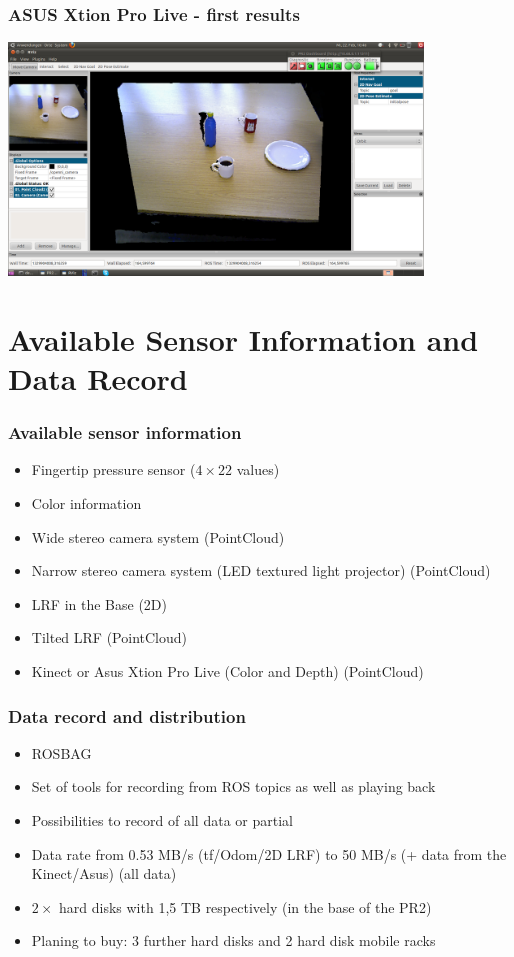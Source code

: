 \begin{frame}
 \frametitle{ASUS Xtion Pro Live - first results}
\includegraphics[width=11cm]{../images/asus1.png}
\end{frame}


\section{Available Sensor Information and Data Record}
\begin{frame}
 \frametitle{Available sensor information}
\begin{itemize}
 \item Fingertip pressure sensor ($4 \times 22$ values)
 \item Color information
 \item Wide stereo camera system (PointCloud)
 \item Narrow stereo camera system (LED textured light projector) (PointCloud)
 \item LRF in the Base (2D)
 \item Tilted LRF (PointCloud)
 \item Kinect or Asus Xtion Pro Live (Color and Depth) (PointCloud)
\end{itemize}

\end{frame}

\begin{frame}
 \frametitle{Data record and distribution}
 \begin{itemize}
  \item ROSBAG
  \item Set of tools for recording from ROS topics as well as playing back
  \item Possibilities to record of all data or partial
  \item Data rate from 0.53 MB/s (tf/Odom/2D LRF) to 50 MB/s (+ data from the Kinect/Asus) (all data)
  \item $2 \times$ hard disks with 1,5 TB respectively (in the base of the PR2)
  \item Planing to buy: 3 further hard disks and 2 hard disk mobile racks
 \end{itemize}

\end{frame}

